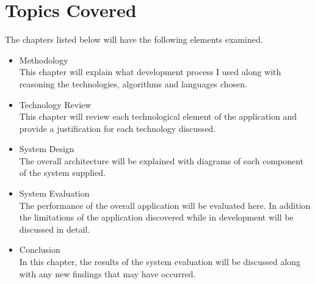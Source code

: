 \section{Topics Covered}
The chapters listed below will have the following elements examined.
\begin{itemize}
	\item Methodology\\
	This chapter will explain what development process I used along with reasoning the technologies, algorithms and languages chosen.
	\item Technology Review\\
	This chapter will review each technological element of the application and provide a justification for each technology discussed.
	\item System Design\\
	The overall architecture will be explained with diagrams of each component of the system supplied.
	\item System Evaluation\\
	The performance of the overall application will be evaluated here. In addition the limitations of the application discovered while in development will be discussed in detail.
	\item Conclusion\\
	In this chapter, the results of the system evaluation will be discussed along with any new findings that may have occurred.
\end{itemize}
